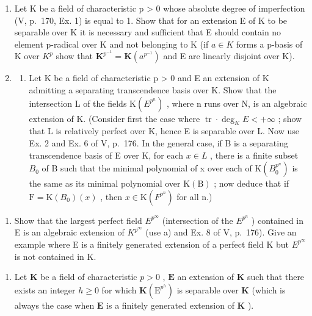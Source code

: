 \begin{enumerate}
\def\labelenumi{\arabic{enumi})}
\setcounter{enumi}{3}
\item
  Let K be a field of characteristic p \textgreater{} 0 whose absolute degree of imperfection (V, p.~170, Ex. 1) is equal to 1. Show that for an extension E of K to be separable over K it is necessary and sufficient that E should contain no element p-radical over K and not belonging to K (if \(a \in K\) forms a p-basis of K over \(K^{p}\) show that \(\mathbf{K}^{p^{-1}} = \mathbf{K}(a^{p^{-1}})\) and E are linearly disjoint over K).
\item
  \begin{enumerate}
  \def\labelenumii{\alph{enumii})}
  \tightlist
  \item
    Let K be a field of characteristic p \textgreater{} 0 and E an extension of K admitting a separating transcendence basis over K. Show that the intersection L of the fields \(\mathrm{K}(E^{p^{n}})\) , where n runs over N, is an algebraic extension of K. (Consider first the case where \(\operatorname{tr} \cdot \deg_{K} E < +\infty\) ; show that L is relatively perfect over K, hence E is separable over L. Now use Ex. 2 and Ex. 6 of V, p.~176. In the general case, if B is a separating transcendence basis of E over K, for each \(x \in L\) , there is a finite subset \(B_{0}\) of B such that the minimal polynomial of x over each of \(\mathrm{K}(B_{0}^{p^{n}})\) is the same as its minimal polynomial over \(\mathrm{K(B)}\) ; now deduce that if \(\mathrm{F} = \mathrm{K}(B_{0})(x)\) , then \(x \in \mathrm{K}(F^{p^{n}})\) for all n.)
  \end{enumerate}
\end{enumerate}

\begin{enumerate}
\def\labelenumi{\alph{enumi})}
\setcounter{enumi}{1}
\tightlist
\item
  Show that the largest perfect field \(E^{p^{\infty}}\) (intersection of the \(E^{p^{n}}\) ) contained in E is an algebraic extension of \(K^{p^{\infty}}\) (use a) and Ex. 8 of V, p.~176). Give an example where E is a finitely generated extension of a perfect field K but \(E^{p^{\infty}}\) is not contained in K.
\end{enumerate}

\begin{enumerate}
\def\labelenumi{\arabic{enumi})}
\setcounter{enumi}{5}
\tightlist
\item
  Let \(\mathbf{K}\) be a field of characteristic \(p > 0\) , \(\mathbf{E}\) an extension of \(\mathbf{K}\) such that there exists an integer \(h \geqslant 0\) for which \(\mathbf{K}(\mathrm{E}^{p^h})\) is separable over \(\mathbf{K}\) (which is always the case when \(\mathbf{E}\) is a finitely generated extension of \(\mathbf{K}\) ).
\end{enumerate}

